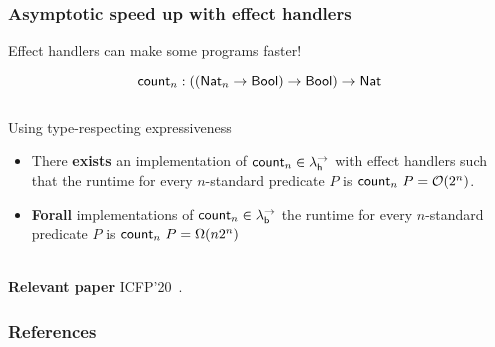 \documentclass[169,10pt,compress,dvipsnames]{beamer}
\begin{document}
\begin{frame}
  \frametitle{Asymptotic speed up with effect handlers}

  Effect handlers can make some programs faster!

  \[
    \mathsf{count}_n : ((\mathsf{Nat}_n \to \mathsf{Bool}) \to \mathsf{Bool}) \to \mathsf{Nat}
  \]\\[1em]
  Using type-respecting expressiveness
  \begin{itemize}
  \item There \textbf{exists} an implementation of $\mathsf{count}_n \in \lambda^\rightarrow_{\mathsf{h}}$ with
    effect handlers such that the runtime for every $n$-standard predicate $P$ is
    $\mathsf{count}_n~P = \mathcal{O}(2^n)$.
  \item \textbf{Forall} implementations of $\mathsf{count}_n \in \lambda^\rightarrow_{\mathsf{b}}$ the runtime for every $n$-standard predicate $P$ is $\mathsf{count}_n~P = \Omega(n2^n)$
  \end{itemize}
  ~\\[1em]
  \textbf{Relevant paper} ICFP'20~\cite{HillerstromLL20}.
\end{frame}


%
%
\begin{frame}%
  \frametitle{References}
  
  
\end{frame}
\end{document}
